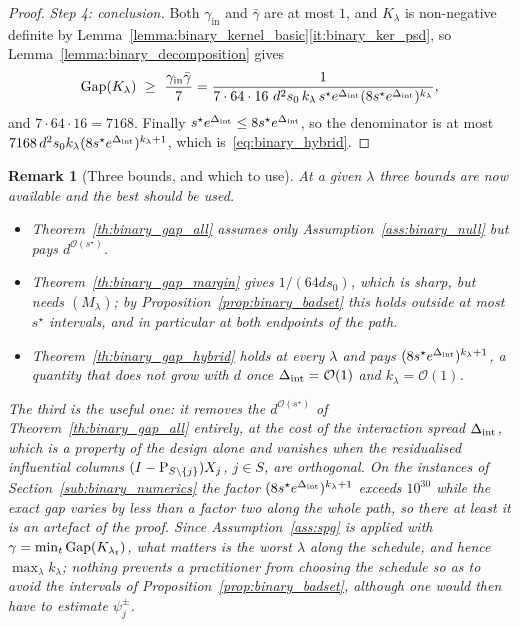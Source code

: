 \documentclass[aos]{imsart}%
\newcommand{\OO}{\mathcal{O}}  %
\theoremstyle{plain}
\newtheorem{remark}{Remark}[section]
\theoremstyle{definition}
\begin{document}
\begin{proof}
        \emph{Step 4: conclusion.} Both $\gamma_{\mathrm{in}}$ and
        $\bar\gamma$ are at most $1$, and $K_\lambda$ is non-negative definite
        by Lemma~\ref{lemma:binary_kernel_basic}\ref{it:binary_ker_psd},
        so Lemma~\ref{lemma:binary_decomposition} gives
        \begin{equation*}
            \Gap(K_\lambda)\ \geq\ \frac{\gamma_{\mathrm{in}}\bar\gamma}{7}
            =\frac{1}{7\cdot64\cdot16\ d^{2}s_0\,k_\lambda\,
            s^{\star}e^{\Spread}(8s^{\star}e^{\Spread})^{k_\lambda}} ,
        \end{equation*}
        and $7\cdot64\cdot16=7168$. Finally
        $s^{\star}e^{\Delta_{\mathrm{int}}}\leq8s^{\star}e^{\Delta_{\mathrm{int}}}$, so the denominator is at
        most $7168\,d^{2}s_0k_\lambda(8s^{\star}e^{\Delta_{\mathrm{int}}})^{k_\lambda+1}$, which
        is~\eqref{eq:binary_hybrid}.
    \end{proof}

    \begin{remark}[Three bounds, and which to use]
        \label{rem:binary_three}
        At a given $\lambda$ three bounds are now available and the best should
        be used.
        \begin{itemize}[leftmargin=1.6em]
            \item Theorem~\ref{th:binary_gap_all} assumes only
            Assumption~\ref{ass:binary_null} but pays $d^{\OO(s^{\star})}$.
            \item Theorem~\ref{th:binary_gap_margin} gives $1/(64ds_0)$, which
            is sharp, but needs $(M_\lambda)$; by
            Proposition~\ref{prop:binary_badset} this holds outside at most
            $s^{\star}$ intervals, and in particular at both endpoints of the
            path.
            \item Theorem~\ref{th:binary_gap_hybrid} holds at every $\lambda$
            and pays $(8s^{\star}e^{\Delta_{\mathrm{int}}})^{k_\lambda+1}$, a quantity that
            does not grow with $d$ once $\Spread=\OO(1)$ and
            $k_\lambda=\OO(1)$.
        \end{itemize}
        The third is the useful one: it removes the $d^{\OO(s^{\star})}$ of
        Theorem~\ref{th:binary_gap_all} entirely, at the cost of the
        interaction spread $\Delta_{\mathrm{int}}$, which is a property of the design alone
        and vanishes when the residualised influential columns
        $(I-\mathrm{P}_{S\setminus\{j\}})X_j$, $j\in S$, are orthogonal. On the
        instances of Section~\ref{sub:binary_numerics} the factor
        $(8s^{\star}e^{\Delta_{\mathrm{int}}})^{k_\lambda+1}$ exceeds $10^{30}$ while the
        exact gap varies by less than a factor two along the whole path, so
        there at least it is an artefact of the proof. Since
        Assumption~\ref{ass:spg} is applied with
        $\gamma=\min_t\mathrm{Gap}(K_{\lambda_t})$, what matters is the worst $\lambda$
        along the schedule, and hence $\max_\lambda k_\lambda$; nothing
        prevents a practitioner from choosing the schedule so as to avoid the
        intervals of Proposition~\ref{prop:binary_badset}, although one would
        then have to estimate $\psi_j^{\pm}$.
    \end{remark}
\end{document}
